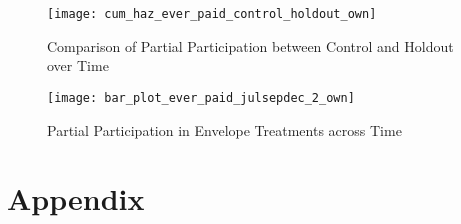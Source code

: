 \documentclass[12pt,titlepage]{article}
\begin{document}
\begin{figure}[htpb]
\begin{center}
\caption{Comparison of Partial Participation between Control and Holdout over Time}
\label{fig:ep_time_ch_own}
\bigskip
\texttt{[image: cum\_haz\_ever\_paid\_control\_holdout\_own]}
\end{center}
\end{figure}

\begin{figure}[htpb]
\begin{center}
\caption{Partial Participation in Envelope Treatments across Time}
\label{fig:ep_time_2_own}
\bigskip
\texttt{[image: bar\_plot\_ever\_paid\_julsepdec\_2\_own]}
\end{center}
\end{figure}

\section{Appendix}

\end{document}
